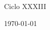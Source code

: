\begin{titlepage}
\begin{center}
\vfill

 
\vspace{\fill}
{\large Ciclo XXXIII}

{\large \usdate\today}\\[4cm] %
\vspace{-40mm} 
\end{center}

\end{titlepage}


\blankpage
\addtocounter{page}{-1}